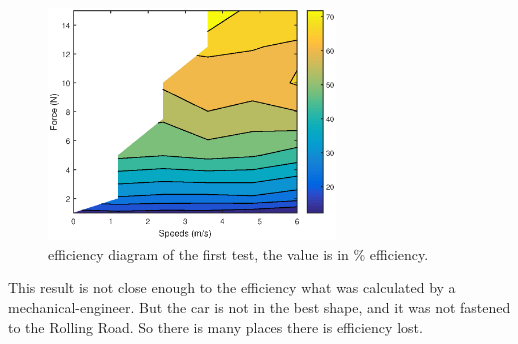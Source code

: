 \begin{figure}[H] 
	\centering
	\includegraphics [width=3in]{SubPages/Images/RR_test_result.eps}
	\caption{efficiency diagram of the first test, the value is in \% efficiency.}
	\label{fig:RR_first_test_result}
\end{figure}
This result is not close enough to the efficiency what was calculated by a mechanical-engineer. But the car is not in the best shape, and it was not fastened to the Rolling Road. So there is many places there is efficiency lost.


